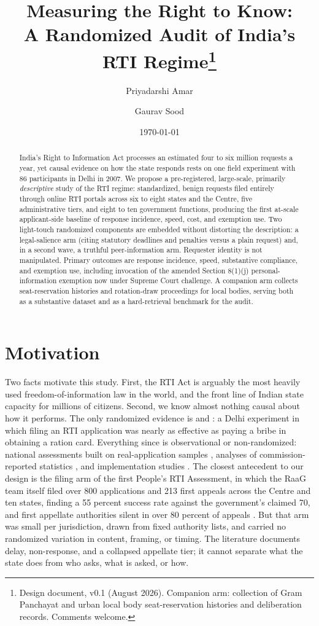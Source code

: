 \documentclass[11pt]{article}
\title{Measuring the Right to Know:\\ A Randomized Audit of India's RTI Regime\thanks{Design document, v0.1 (August 2026). Companion arm: collection of Gram Panchayat and urban local body seat-reservation histories and deliberation records. Comments welcome.}}
\author{Priyadarshi Amar \and Gaurav Sood}
\date{\today}
\begin{document}
\maketitle
\onehalfspacing

\begin{abstract}
\noindent India's Right to Information Act processes an estimated four to six million requests a year, yet causal evidence on how the state responds rests on one field experiment with 86 participants in Delhi in 2007. We propose a pre-registered, large-scale, primarily \emph{descriptive} study of the RTI regime: standardized, benign requests filed entirely through online RTI portals across six to eight states and the Centre, five administrative tiers, and eight to ten government functions, producing the first at-scale applicant-side baseline of response incidence, speed, cost, and exemption use. Two light-touch randomized components are embedded without distorting the description: a legal-salience arm (citing statutory deadlines and penalties versus a plain request) and, in a second wave, a truthful peer-information arm. Requester identity is not manipulated. Primary outcomes are response incidence, speed, substantive compliance, and exemption use, including invocation of the amended Section 8(1)(j) personal-information exemption now under Supreme Court challenge. A companion arm collects seat-reservation histories and rotation-draw proceedings for local bodies, serving both as a substantive dataset and as a hard-retrieval benchmark for the audit.
\end{abstract}

\section{Motivation}
\label{sec:motivation}

Two facts motivate this study. First, the RTI Act is arguably the most heavily used freedom-of-information law in the world, and the front line of Indian state capacity for millions of citizens. Second, we know almost nothing causal about how it performs. The only randomized evidence is \citet{peisakhin2010} and \citet{peisakhin2012}: a Delhi experiment in which filing an RTI application was nearly as effective as paying a bribe in obtaining a ration card. Everything since is observational or non-randomized: national assessments built on real-application samples \citep{raag2009, raag2014, pria2008, pwc2009}, analyses of commission-reported statistics \citep{sns2025}, and implementation studies \citep{relly2020}. The closest antecedent to our design is the filing arm of the first People's RTI Assessment, in which the RaaG team itself filed over 800 applications and 213 first appeals across the Centre and ten states, finding a 55 percent success rate against the government's claimed 70, and first appellate authorities silent in over 80 percent of appeals \citep{raag2009}. But that arm was small per jurisdiction, drawn from fixed authority lists, and carried no randomized variation in content, framing, or timing. The literature documents delay, non-response, and a collapsed appellate tier; it cannot separate what the state does from who asks, what is asked, or how.
\end{document}
